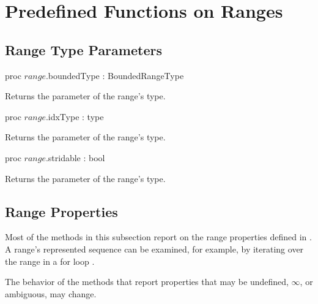\section{Predefined Functions on Ranges}
\label{Predefined_Range_Functions}

\subsection{Range Type Parameters}
\label{Range_Type_Accessors}

\begin{protohead}
proc $range$.boundedType : BoundedRangeType
\end{protohead}
\begin{protobody}
Returns the  parameter of the range's type.
\end{protobody}

\begin{protohead}
proc $range$.idxType : type
\end{protohead}
\begin{protobody}
Returns the  parameter of the range's type.
\end{protobody}

\begin{protohead}
proc $range$.stridable : bool
\end{protohead}
\begin{protobody}
Returns the  parameter of the range's type.
\end{protobody}

\subsection{Range Properties}
\label{Range_Properties}

Most of the methods in this subsection report on
the range properties defined in .
A range's represented sequence can be examined, for example,
by iterating over the range in a for loop .

\begin{openissue}
The behavior of the methods that report properties that may be
undefined, $\infty$, or ambiguous, may change.
\end{openissue}

